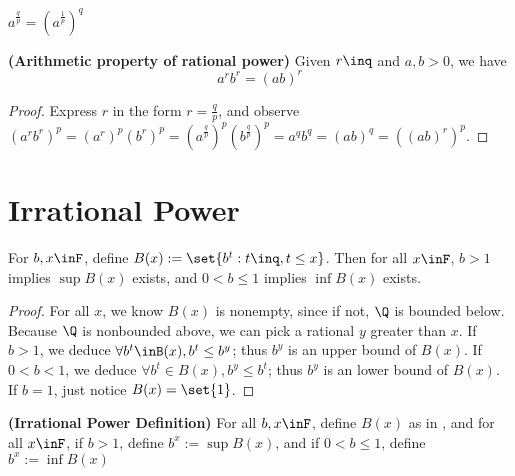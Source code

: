 \documentclass{report}
\begin{document}
\begin{corollary}
\label{1.3.14}
$a^{\frac{q}{p}}=(a^{\frac{1}{p}})^q$
\end{corollary}
\begin{theorem}
\label{1.3.15}
\textbf{(Arithmetic property of rational power)} Given $r\inq$ and $a,b>0$, we have
 \begin{equation*}
a^rb^r=(ab)^r
\end{equation*}
\end{theorem}
\begin{proof}
Express $r$ in the form  $r=\frac{q}{p}$, and observe $(a^rb^r)^p=(a^r)^p(b^r)^p=(a^{\frac{q}{p}})^p(b^{\frac{q}{p}})^p=a^qb^q=(ab)^q=((ab)^r)^p$. 
\end{proof}
\section{Irrational Power}
\begin{lemma}
\label{1.4.1}
For $b,x\inF$, define  $B(x):=\set{b^t:t\inq,t\leq x}$. Then for all $x\inF$, $b>1$ implies  $\sup B(x)$ exists, and $0<b\leq 1$ implies $\inf B(x)$ exists.
\end{lemma}
\begin{proof}
  For all $x$,  we know $B(x)$ is nonempty, since if not, $\Q$ is bounded below. Because $\Q$ is nonbounded above, we can pick a rational  $y$ greater than $x$. If $b>1$, we deduce  $\forall b^t\inB(x),b^t\leq b^y $; thus $b^y$ is an upper bound of  $B(x)$. If $0<b<1$, we deduce $\forall b^t\in B(x),b^y\leq b^t$; thus $b^y$ is an lower bound of $B(x)$. If $b=1$, just notice  $B(x)=\set{1}$.     
\end{proof}
\begin{definition}
\label{1.4.2}
\textbf{(Irrational Power Definition)} For all $b,x\inF$, define $B(x)$ as in , and for all $x\inF$, if $b>1$, define $b^x:=\sup B(x)$, and if $0<b\leq 1$, define $b^x:=\inf B(x)$ 
\end{definition}
\end{document}
